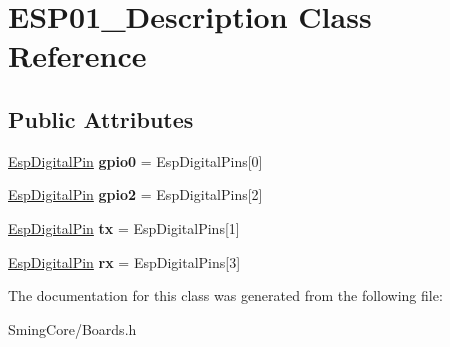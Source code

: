 \hypertarget{class_e_s_p01___description}{}\section{E\+S\+P01\+\_\+\+Description Class Reference}
\label{class_e_s_p01___description}
\subsection*{Public Attributes}
\begin{DoxyCompactItemize}
\item 
\hypertarget{class_e_s_p01___description_a2a827569281a4568f101e31d4f2721ea}{}\hyperlink{struct_esp_digital_pin}{Esp\+Digital\+Pin} {\bfseries gpio0} = Esp\+Digital\+Pins\mbox{[}0\mbox{]}\label{class_e_s_p01___description_a2a827569281a4568f101e31d4f2721ea}

\item 
\hypertarget{class_e_s_p01___description_a8ab8a331db4d6c03147049d9aaa62759}{}\hyperlink{struct_esp_digital_pin}{Esp\+Digital\+Pin} {\bfseries gpio2} = Esp\+Digital\+Pins\mbox{[}2\mbox{]}\label{class_e_s_p01___description_a8ab8a331db4d6c03147049d9aaa62759}

\item 
\hypertarget{class_e_s_p01___description_a563919a8fe237a6ad231f9733b3a264a}{}\hyperlink{struct_esp_digital_pin}{Esp\+Digital\+Pin} {\bfseries tx} = Esp\+Digital\+Pins\mbox{[}1\mbox{]}\label{class_e_s_p01___description_a563919a8fe237a6ad231f9733b3a264a}

\item 
\hypertarget{class_e_s_p01___description_a8baf1743bfc916f889f0e8dca52d2abe}{}\hyperlink{struct_esp_digital_pin}{Esp\+Digital\+Pin} {\bfseries rx} = Esp\+Digital\+Pins\mbox{[}3\mbox{]}\label{class_e_s_p01___description_a8baf1743bfc916f889f0e8dca52d2abe}

\end{DoxyCompactItemize}


The documentation for this class was generated from the following file\+:\begin{DoxyCompactItemize}
\item 
Sming\+Core/Boards.\+h\end{DoxyCompactItemize}
